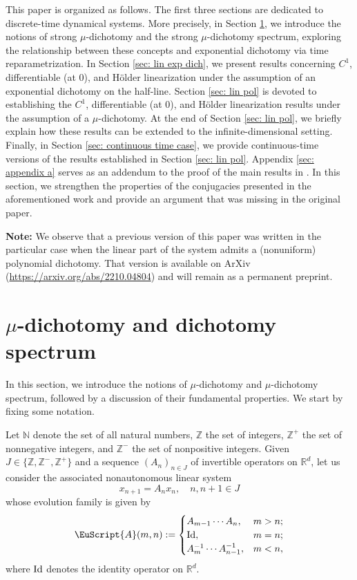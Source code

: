 \documentclass[reqno, a4paper, 10pt]{amsart}
\theoremstyle{plain}
\numberwithin{equation}{section}
\theoremstyle{remark}
\def\N{\mathbb{N}}
\def\cA{\EuScript{A}}
\def\R{\mathbb{R}}
\def\Id{\text{\rm Id}}
\def\Z{\mathbb{Z}}
\begin{document}
This paper is organized as follows. The first three sections are dedicated to discrete-time dynamical systems. More precisely, in Section \ref{sec: pol dich}, we introduce the notions of strong $\mu$-dichotomy and the strong $\mu$-dichotomy spectrum, exploring the relationship between these concepts and exponential dichotomy via time reparametrization. In Section \ref{sec: lin exp dich}, we present results concerning $C^1$, differentiable (at 0), and Hölder linearization under the assumption of an exponential dichotomy on the half-line. Section \ref{sec: lin pol} is devoted to establishing the $C^1$, differentiable (at 0), and Hölder linearization results under the assumption of a $\mu$-dichotomy. At the end of Section \ref{sec: lin pol}, we briefly explain how these results can be extended to the infinite-dimensional setting. Finally, in Section \ref{sec: continuous time case}, we provide continuous-time versions of the results established in Section \ref{sec: lin pol}. 
Appendix \ref{sec: appendix a} serves as an addendum to the proof of the main results in \cite{DZZ}. In this section, we strengthen the properties of the conjugacies presented in the aforementioned work and provide an argument that was missing in the original paper. 



\vspace{0.1in}
\textbf{Note:} We observe that a previous version of this paper was written in the particular case when the linear part of the system admits a (nonuniform) polynomial dichotomy. That version is available on ArXiv (\href{https://arxiv.org/abs/2210.04804}{https://arxiv.org/abs/2210.04804}) and will remain as a permanent preprint.



\section{$\mu$-dichotomy and dichotomy spectrum} \label{sec: pol dich} 
In this section, we introduce the notions of $\mu$-dichotomy and $\mu$-dichotomy spectrum, followed by a discussion of their fundamental properties. We start by fixing some notation. 


Let $\N$ denote the set of all natural numbers, $\Z$ the set of integers, $\Z^+$ the set of nonnegative integers, and $\Z^-$ the set of nonpositive integers. Given $J\in \{\Z, \Z^-, \Z^+\}$ and a sequence $(A_n)_{n\in J}$ of invertible operators on $\R^d$, let us consider the associated nonautonomous linear system
\begin{equation}\label{eq: LE}
    x_{n+1}=A_nx_n, \quad n,n+1\in J
\end{equation}
whose evolution family is given by
\begin{equation}\label{eq: cocycle}
\cA(m,n):=\begin{cases}
A_{m-1} \cdots A_n, & m>n; \\
\Id, & m=n;\\
A_m^{-1} \cdots A_{n-1}^{-1}, & m<n,
\end{cases}
\end{equation}
where $\Id$ denotes the identity operator on $\R^d$.
\end{document}

